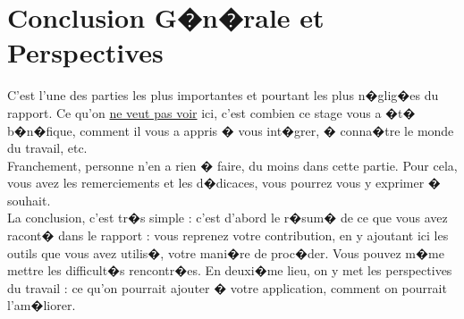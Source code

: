 \chapter{Conclusion G�n�rale et Perspectives}
\pagestyle{fancy}
\fancyhf{}
\fancyhead[R]{\bfseries\rightmark}
\fancyfoot[R]{\thepage}
\renewcommand{\headrulewidth}{0.5pt}
\renewcommand{\footrulewidth}{0pt}
\renewcommand{\chaptermark}[1]{\markboth{\MakeUppercase{\chaptername~\thechapter. #1 }}{}}
\renewcommand{\sectionmark}[1]{\markright{\thechapter.\thesection~ #1}}

\begin{spacing}{1.2}

C'est l'une des parties les plus importantes et pourtant les plus n�glig�es 
du rapport. Ce qu'on \underline{ne veut pas voir} ici, c'est combien ce stage vous a �t� b�n�fique, comment il vous a appris � vous int�grer, � conna�tre le monde du travail, etc.\\
Franchement, personne n'en a rien � faire, du moins dans cette partie. Pour cela, vous 
avez les remerciements et les d�dicaces, vous pourrez vous y exprimer � souhait.\\
La conclusion, c'est tr�s simple : c'est d'abord le r�sum� de ce que vous avez racont�
dans le rapport : vous reprenez votre contribution, en y ajoutant ici les outils que vous 
avez utilis�, votre mani�re de proc�der. Vous pouvez m�me mettre les difficult�s
rencontr�es. En deuxi�me lieu, on y met les perspectives du travail : ce qu'on pourrait 
ajouter � votre application, comment on pourrait l'am�liorer.

\end{spacing}